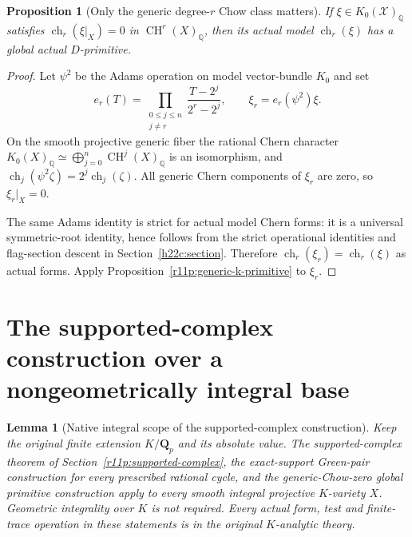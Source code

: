 \documentclass[11pt,a4paper]{article}
\newtheorem{lemma}[theorem]{Lemma}
\newtheorem{proposition}[theorem]{Proposition}
\theoremstyle{definition}
\theoremstyle{remark}
\begin{document}
\begin{proposition}[Only the generic degree-$r$ Chow class matters]
\label{r11p:generic-chow-primitive}
If $\xi\in K_0(\mathcal X)_{\mathbb Q}$ satisfies
$\operatorname{ch}_r(\xi|_X)=0$ in
$\operatorname{CH}^r(X)_{\mathbb Q}$, then its actual model
$\operatorname{ch}_r(\xi)$ has a global actual $D$-primitive.
\end{proposition}

\begin{proof}
Let $\psi^2$ be the Adams operation on model vector-bundle $K_0$ and set
\[
 e_r(T)=\prod_{\substack{0\leq j\leq n\\j\ne r}}
                  \frac{T-2^j}{2^r-2^j},
 \qquad
                            \xi_r=e_r(\psi^2)\xi.
\]
On the smooth projective generic fiber the rational Chern character
$K_0(X)_{\mathbb Q}\simeq\bigoplus_{j=0}^n
\operatorname{CH}^j(X)_{\mathbb Q}$ is an isomorphism, and
$\operatorname{ch}_j(\psi^2\zeta)=2^j\operatorname{ch}_j(\zeta)$.
All generic Chern components of $\xi_r$ are zero, so $\xi_r|_X=0$.

The same Adams identity is strict for actual model Chern forms:
it is a universal symmetric-root identity, hence follows from
the strict operational identities and flag-section descent in
Section~\ref{h22c:section}.
Therefore $\operatorname{ch}_r(\xi_r)=\operatorname{ch}_r(\xi)$
as actual forms.  Apply Proposition~\ref{r11p:generic-k-primitive}
to $\xi_r$.
\end{proof}



\section{The supported-complex construction over a nongeometrically integral base}
\label{r12i:section}

\begin{lemma}[Native integral scope of the supported-complex construction]
\label{r12i:integral-PC}
Keep the original finite extension $K/\mathbf Q_p$ and its absolute
value.  The supported-complex theorem of Section~\ref{r11p:supported-complex}, the exact-support
Green-pair construction for every prescribed rational cycle, and
the generic-Chow-zero global primitive construction apply to every
smooth integral projective $K$-variety $X$.  Geometric integrality
over $K$ is not required.  Every actual form, test and finite-trace
operation in these statements is in the original $K$-analytic theory.
\end{lemma}
\end{document}
